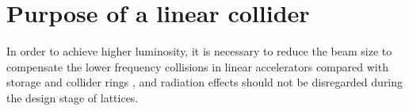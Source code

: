 \chapter{Purpose of a linear collider}


In order to achieve higher luminosity, it is necessary to reduce the beam size to compensate the lower frequency collisions in linear accelerators compared with storage and collider rings \cite{Delahaye1999369}, and radiation effects should not be disregarded during the design stage of lattices. 
